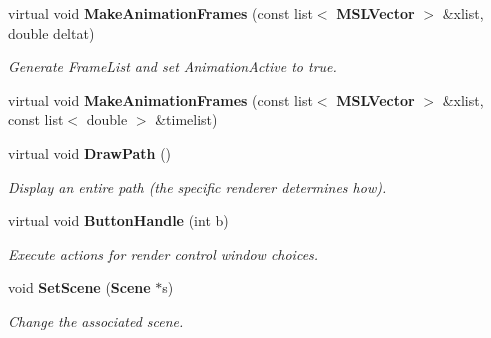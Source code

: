 \begin{CompactItemize}
virtual void {\bf Make\-Animation\-Frames} (const list$<$ {\bf MSLVector} $>$ \&xlist, double deltat)
\begin{CompactList}\small\item\em Generate Frame\-List and set Animation\-Active to true.\item\end{CompactList}\item 
virtual void {\bf Make\-Animation\-Frames} (const list$<$ {\bf MSLVector} $>$ \&xlist, const list$<$ double $>$ \&timelist)
\item 
virtual void {\bf Draw\-Path} ()
\begin{CompactList}\small\item\em Display an entire path (the specific renderer determines how).\item\end{CompactList}\item 
virtual void {\bf Button\-Handle} (int b)
\begin{CompactList}\small\item\em Execute actions for render control window choices.\item\end{CompactList}\item 
void {\bf Set\-Scene} ({\bf Scene} $\ast$s)
\begin{CompactList}\small\item\em Change the associated scene.\item\end{CompactList}\end{CompactItemize}
